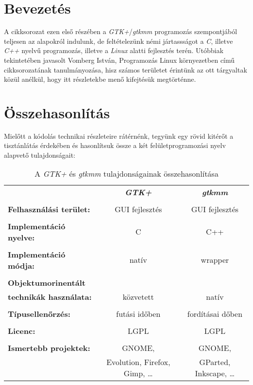 \section{Bevezetés}

A cikksorozat ezen első részében a \textit{GTK+}/\textit{gtkmm} programozás szempontjából teljesen az alapokról indulunk, de feltételezünk némi jártassságot a \textit{C}, illetve \textit{C++} nyelvű programozás, illetve a \textit{Linux} alatti fejlesztés terén. Utóbbiak tekintetében javasolt Vomberg István, Programozás Linux környezetben című cikksorozatának tanulmányozása, hisz számos területet érintünk az ott tárgyaltak közül anélkül, hogy itt részletekbe menő kifejtésük megtörténne.

\section{Összehasonlítás}

Mielőtt a kódolás technikai részleteire rátérnénk, tegyünk egy rövid kitérőt a tisztánlátás érdekében és hasonlítsuk össze a két felületprogramozási nyelv alapvető tulajdonságait:\vspace{16pt}

\begin{table}[H]
\begin{center}
\begin{tabular}[t]{l c c}
                                       & \textbf{\textit{GTK+}}            & \textbf{\textit{gtkmm}}  \\\\
\textbf{Felhasználási terület:}        & GUI fejlesztés                    & GUI fejlesztés   \\\\
\textbf{Implementáció nyelve:}         & C                                 & C++              \\\\
\textbf{Implementáció módja:}          & natív                             & wrapper          \\\\
\textbf{Objektumorinentált}            &                                   &                  \\
\textbf{technikák használata:}         & közvetett                         & natív            \\\\
\textbf{Típusellenőrzés:}              & futási időben                     & fordításai dőben \\\\
\textbf{Licenc:}                       & LGPL                              & LGPL             \\\\
\textbf{Ismertebb projektek:}          & GNOME,                            & GNOME,                   \\
                                       & Evolution, Firefox, Gimp, \dots   & GParted, Inkscape, \dots \\
\end{tabular}
\caption{A \textit{GTK+} és \textit{gtkmm} tulajdonságainak összehasonlítása}
\end{center}
\end{table}



